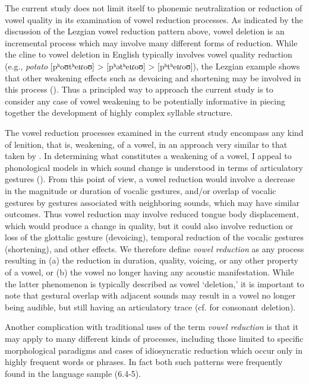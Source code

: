   The current study does not limit itself to phonemic neutralization or reduction of vowel quality in its examination of vowel reduction processes. As indicated by the discussion of the Lezgian vowel reduction pattern above, vowel deletion is an incremental process which may involve many different forms of reduction. While the cline to vowel deletion in English typically involves vowel quality reduction (e.g., \textit{potato} [pʰoʊtʰeɪɾoʊ] > [pʰətʰeɪɾoʊ] > [pʰtʰeɪɾoʊ]), the Lezgian example shows that other weakening effects such as devoicing and shortening may be involved in this process (\citealt{ChitoranBabaliyeva2007}). Thus a principled way to approach the current study is to consider any case of vowel weakening to be potentially informative in piecing together the development of highly complex syllable structure.

  The vowel reduction processes examined in the current study encompass any kind of lenition, that is, weakening, of a vowel, in an approach very similar to that taken by \citet{KapatsinskiEtAl2019}. In determining what constitutes a weakening of a vowel, I appeal to phonological models in which sound change is understood in terms of articulatory gestures (\citealt{BrowmanGoldstein1992b,MowreyPagliuca1995}). From this point of view, a vowel reduction would involve a decrease in the magnitude or duration of vocalic gestures, and/or overlap of vocalic gestures by gestures associated with neighboring sounds, which may have similar outcomes. Thus vowel reduction may involve reduced tongue body displacement, which would produce a change in quality, but it could also involve reduction or loss of the glottalic gesture (devoicing), temporal reduction of the vocalic gestures (shortening), and other effects. We therefore define \textit{vowel reduction} as any process resulting in 
  (a) the reduction in duration, quality, voicing, or any other property of a vowel, or 
  (b) the vowel no longer having any acoustic manifestation. While the latter phenomenon is typically described as vowel ‘deletion,’ it is important to note that gestural overlap with adjacent sounds may result in a vowel no longer being audible, but still having an articulatory trace (cf. \citealt{BrowmanGoldstein1990} for consonant deletion).

  Another complication with traditional uses of the term \textit{vowel reduction} is that it may apply to many different kinds of processes, including those limited to specific morphological paradigms and cases of idiosyncratic reduction which occur only in highly frequent words or phrases. In fact both such patterns were frequently found in the language sample (6.4-5).


